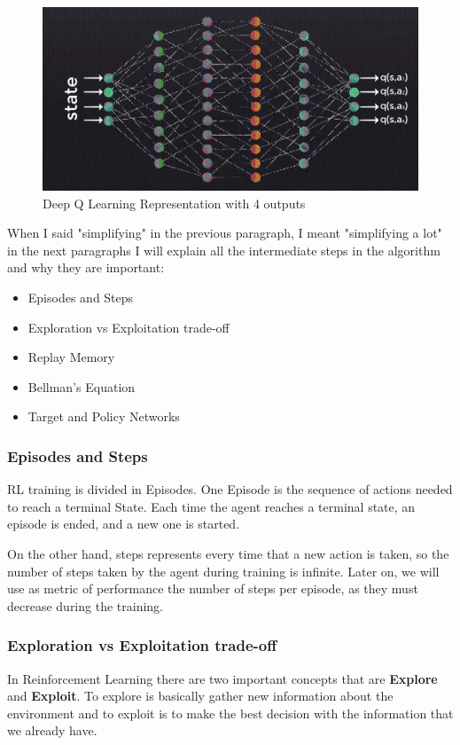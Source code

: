 		\begin{figure}[h]
			\centering
			\includegraphics[width=0.7\linewidth]{Images/DeepQ-Network.jpg}
			\caption[Deep Q Learning]{Deep Q Learning Representation with 4 outputs}
			\label{fig:deepqnetwork}
		\end{figure}
		
		When I said "simplifying" in the previous paragraph, I meant "simplifying a lot" in the next paragraphs I will explain all the intermediate steps in the algorithm and why they are important:
		
		\begin{itemize}
			\item[\textendash]Episodes and Steps
			\item[\textendash]Exploration vs Exploitation trade-off
			\item[\textendash]Replay Memory
			\item[\textendash]Bellman's Equation
			\item[\textendash]Target and Policy Networks
		\end{itemize}
	
		\subsubsection{Episodes and Steps}
			RL training is divided in Episodes. One Episode is the sequence of actions needed to reach a terminal State. Each time the agent reaches a terminal state, an episode is ended, and a new one is started.
			
			On the other hand, steps represents every time that a new action is taken, so the number of steps taken by the agent during training is infinite. Later on, we will use as metric of performance the number of steps per episode, as they must decrease during the training.
		
		\subsubsection{Exploration vs Exploitation trade-off}
			In Reinforcement Learning there are two important concepts that are \textbf{Explore} and \textbf{Exploit}. To explore is basically gather new information about the environment and to exploit is to make the best decision with the information that we already have.
			
